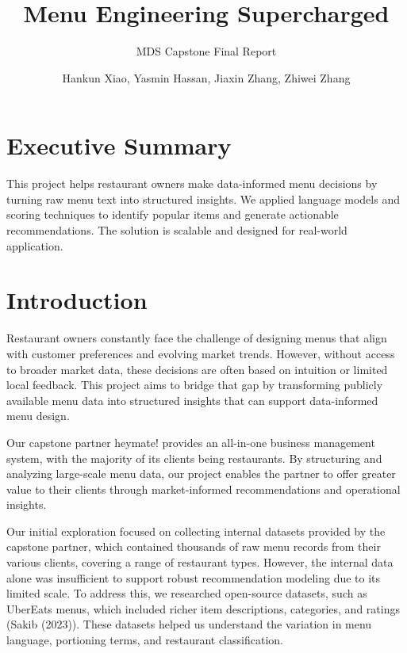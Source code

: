 \documentclass[
  11pt,
  a4paper,
  DIV=11,
  numbers=noendperiod]{scrartcl}
\title{Menu Engineering Supercharged}
\subtitle{MDS Capstone Final Report}
\author{Hankun Xiao, Yasmin Hassan, Jiaxin Zhang, Zhiwei Zhang}
\date{}
\renewcommand*\contentsname{Table of contents}
\newcommand\contentsname{Table of contents}
\begin{document}
\maketitle

\renewcommand*\contentsname{Table of contents}
{
\hypersetup{linkcolor=}
\setcounter{tocdepth}{2}
\tableofcontents
}

\section{Executive Summary}\label{executive-summary}

This project helps restaurant owners make data-informed menu decisions
by turning raw menu text into structured insights. We applied language
models and scoring techniques to identify popular items and generate
actionable recommendations. The solution is scalable and designed for
real-world application.

\section{Introduction}\label{introduction}

Restaurant owners constantly face the challenge of designing menus that
align with customer preferences and evolving market trends. However,
without access to broader market data, these decisions are often based
on intuition or limited local feedback. This project aims to bridge that
gap by transforming publicly available menu data into structured
insights that can support data-informed menu design.

Our capstone partner heymate! provides an all-in-one business management
system, with the majority of its clients being restaurants. By
structuring and analyzing large-scale menu data, our project enables the
partner to offer greater value to their clients through market-informed
recommendations and operational insights.

Our initial exploration focused on collecting internal datasets provided
by the capstone partner, which contained thousands of raw menu records
from their various clients, covering a range of restaurant types.
However, the internal data alone was insufficient to support robust
recommendation modeling due to its limited scale. To address this, we
researched open-source datasets, such as UberEats menus, which included
richer item descriptions, categories, and ratings (Sakib (2023)). These
datasets helped us understand the variation in menu language, portioning
terms, and restaurant classification.
\end{document}
